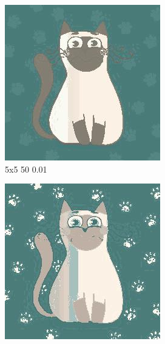 \documentclass[12pt,a4paper]{article}
\begin{document}
\begin{figure}[H]
\medskip
\begin{subfigure}{0.25\textwidth}
  \includegraphics[width=\linewidth]{images/cartoon/5-5-50-001}
  \caption{5x5 50 0.01}
  \label{fig:4}
\end{subfigure}\hfil %
\begin{subfigure}{0.25\textwidth}
  \includegraphics[width=\linewidth]{images/cartoon/5-5-255-05}

\end{subfigure}
\end{figure}
\end{document}

